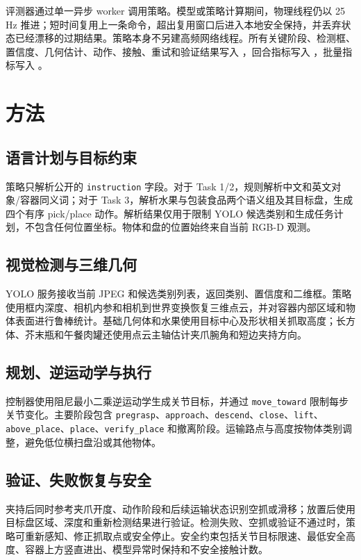 \documentclass[11pt,a4paper]{ctexart}
\begin{document}
评测器通过单一异步 worker 调用策略。模型或策略计算期间，物理线程仍以 25 Hz 推进；短时间复用上一条命令，超出复用窗口后进入本地安全保持，并丢弃状态已经漂移的过期结果。策略本身不另建高频网络线程。所有关键阶段、检测框、置信度、几何估计、动作、接触、重试和验证结果写入 ，回合指标写入 ，批量指标写入 。

\section{方法}

\subsection{语言计划与目标约束}

策略只解析公开的 \texttt{instruction} 字段。对于 Task 1/2，规则解析中文和英文对象/容器同义词；对于 Task 3，解析水果与包装食品两个语义组及其目标盘，生成四个有序 pick/place 动作。解析结果仅用于限制 YOLO 候选类别和生成任务计划，不包含任何位置坐标。物体和盘的位置始终来自当前 RGB-D 观测。

\subsection{视觉检测与三维几何}

YOLO 服务接收当前 JPEG 和候选类别列表，返回类别、置信度和二维框。策略使用框内深度、相机内参和相机到世界变换恢复三维点云，并对容器内部区域和物体表面进行鲁棒统计。基础几何体和水果使用目标中心及形状相关抓取高度；长方体、芥末瓶和午餐肉罐还使用点云主轴估计夹爪腕角和短边夹持方向。

\subsection{规划、逆运动学与执行}

控制器使用阻尼最小二乘逆运动学生成关节目标，并通过 \texttt{move\_toward} 限制每步关节变化。主要阶段包含 \texttt{pregrasp}、\texttt{approach}、\texttt{descend}、\texttt{close}、\texttt{lift}、\texttt{above\_place}、\texttt{place}、\texttt{verify\_place} 和撤离阶段。运输路点与高度按物体类别调整，避免低位横扫盘沿或其他物体。

\subsection{验证、失败恢复与安全}

夹持后同时参考夹爪开度、动作阶段和后续运输状态识别空抓或滑移；放置后使用目标盘区域、深度和重新检测结果进行验证。检测失败、空抓或验证不通过时，策略可重新感知、修正抓取点或安全停止。安全约束包括关节目标限速、最低安全高度、容器上方竖直进出、模型异常时保持和不安全接触计数。
\end{document}
